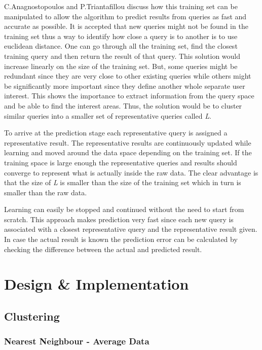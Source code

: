 \documentclass{lmproj}
\begin{document}
C.Anagnostopoulos and P.Triantafillou\cite{learningCount} discuss how this training set can be manipulated to allow the algorithm to predict results from queries as fast and accurate as possible. It is accepted that new queries might not be found in the training set thus a way to identify how close a query is to another is to use euclidean distance. One can go through all the training set, find the closest training query and then return the result of that query. This solution would increase linearly on the size of the training set. But, some queries might be redundant since they are very close to other existing queries while others might be significantly more important since they define another whole separate user interest. This shows the importance to extract information from the query space and be able to find the interest areas. Thus, the solution would be to cluster similar queries into a smaller set of representative queries called \textit{L}.

To arrive at the prediction stage each representative query is assigned a representative result. The representative results are continuously updated while learning and moved around the data space depending on the training set. If the training space is large enough the representative queries and results should converge to represent what is actually inside the raw data. The clear advantage is that the size of \textit{L} is smaller than the size of the training set which in turn is smaller than the raw data.\cite{learningCount}

Learning can easily be stopped and continued without the need to start from scratch. This approach makes prediction very fast since each new query is associated with a closest representative query and the representative result given. In case the actual result is known the prediction error can be calculated by checking the difference between the actual and predicted result.\cite{learningCount}

\chapter{Design \& Implementation}
\label{design}

\section{Clustering}

\subsection{Nearest Neighbour - Average Data}
\end{document}
